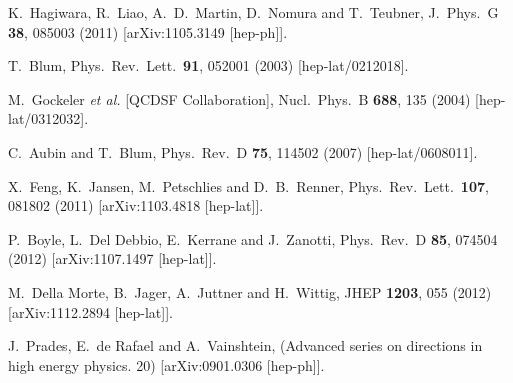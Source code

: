 \begin{thebibliography}{99}
  K.~Hagiwara, R.~Liao, A.~D.~Martin, D.~Nomura and T.~Teubner,
  J.\ Phys.\ G {\bf 38}, 085003 (2011)
  [arXiv:1105.3149 [hep-ph]].

  T.~Blum,
  Phys.\ Rev.\ Lett.\  {\bf 91}, 052001 (2003)
  [hep-lat/0212018].

  M.~Gockeler {\it et al.}  [QCDSF Collaboration],
  Nucl.\ Phys.\ B {\bf 688}, 135 (2004)
  [hep-lat/0312032].

  C.~Aubin and T.~Blum,
  Phys.\ Rev.\ D {\bf 75}, 114502 (2007)
  [hep-lat/0608011].

  X.~Feng, K.~Jansen, M.~Petschlies and D.~B.~Renner,
  Phys.\ Rev.\ Lett.\  {\bf 107}, 081802 (2011)
  [arXiv:1103.4818 [hep-lat]].

  P.~Boyle, L.~Del Debbio, E.~Kerrane and J.~Zanotti,
  Phys.\ Rev.\ D {\bf 85}, 074504 (2012)
  [arXiv:1107.1497 [hep-lat]].

  M.~Della Morte, B.~Jager, A.~Juttner and H.~Wittig,
  JHEP {\bf 1203}, 055 (2012)
  [arXiv:1112.2894 [hep-lat]].

  J.~Prades, E.~de Rafael and A.~Vainshtein,
  (Advanced series on directions in high energy physics. 20)
  [arXiv:0901.0306 [hep-ph]].


\end{thebibliography}
